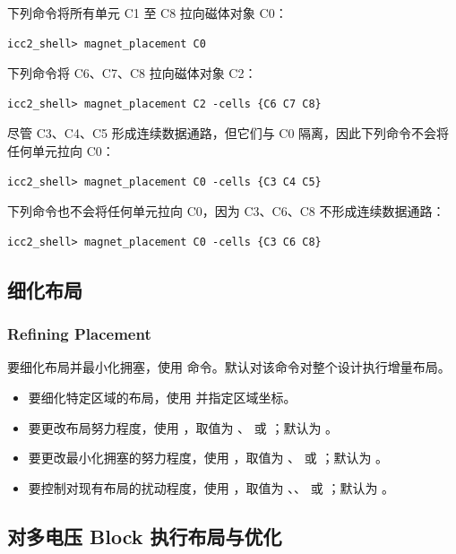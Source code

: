 下列命令将所有单元 C1 至 C8 拉向磁体对象 C0：
\begin{lstlisting}
icc2_shell> magnet_placement C0
\end{lstlisting}

下列命令将 C6、C7、C8 拉向磁体对象 C2：
\begin{lstlisting}
icc2_shell> magnet_placement C2 -cells {C6 C7 C8}
\end{lstlisting}

尽管 C3、C4、C5 形成连续数据通路，但它们与 C0 隔离，因此下列命令不会将任何单元拉向 C0：
\begin{lstlisting}
icc2_shell> magnet_placement C0 -cells {C3 C4 C5}
\end{lstlisting}

下列命令也不会将任何单元拉向 C0，因为 C3、C6、C8 不形成连续数据通路：
\begin{lstlisting}
icc2_shell> magnet_placement C0 -cells {C3 C6 C8}
\end{lstlisting}

\subsection{细化布局}
\subsubsection*{Refining Placement}

要细化布局并最小化拥塞，使用  命令。默认对该命令对整个设计执行增量布局。
\begin{itemize}
  \item 要细化特定区域的布局，使用  并指定区域坐标。
  \item 要更改布局努力程度，使用 ，取值为 、 或 ；默认为 。
  \item 要更改最小化拥塞的努力程度，使用 ，取值为 、 或 ；默认为 。
  \item 要控制对现有布局的扰动程度，使用 ，取值为 、、 或 ；默认为 。
\end{itemize}

\subsection{对多电压 Block 执行布局与优化}
